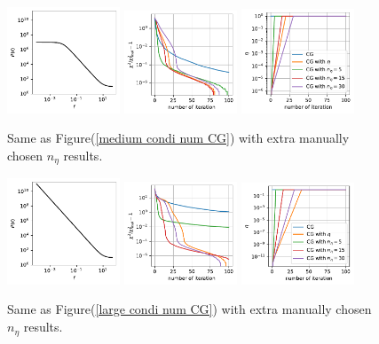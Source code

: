 \documentclass[twocolumn,linenumbers]{aastex631}
\begin{document}
\begin{figure}[htb!]
\centering
\includegraphics[width=0.3\textwidth]{0.1/medium_condition_num/P_f.pdf}
\includegraphics[width=0.3\textwidth]{0.1/medium_condition_num/chi2.pdf}
\includegraphics[width=0.3\textwidth]{0.1/medium_condition_num/eta.pdf}
\caption{Same as Figure(\ref{medium condi num CG}) with extra manually chosen 
    $n_{\eta}$ results.
}
\label{medium condi num}
\end{figure}

\begin{figure}[htb!]
\centering
\includegraphics[width=0.3\textwidth]{0.1/large_condition_num/p_f.pdf}
\includegraphics[width=0.3\textwidth]{0.1/large_condition_num/chi2.pdf}
\includegraphics[width=0.3\textwidth]{0.1/large_condition_num/eta.pdf}
\caption{Same as Figure(\ref{large condi num CG}) with extra manually chosen 
    $n_{\eta}$ results.
}
\label{large condi num}
\end{figure}
\end{document}
